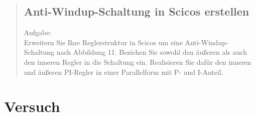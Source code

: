 \begin{quote}
\begin{quote}
\begin{quote}
		\end{quote}
		
	\end{quote}
	
	\subsection{Anti-Windup-Schaltung in Scicos erstellen}
	Aufgabe:\\
    Erweitern Sie Ihre Reglerstruktur in Scicos um eine Anti-Windup-Schaltung nach Abbildung 11. Beziehen Sie sowohl
    den äußeren als auch den inneren Regler in die Schaltung ein. Realisieren Sie dafür den inneren und äußeren
    PI-Regler in einer Parallelform mit P- und I-Anteil.
	\begin{quote}
		
		
	\end{quote}
	
\end{quote}


\section{Versuch}
\begin{quote}
    
\end{quote}


